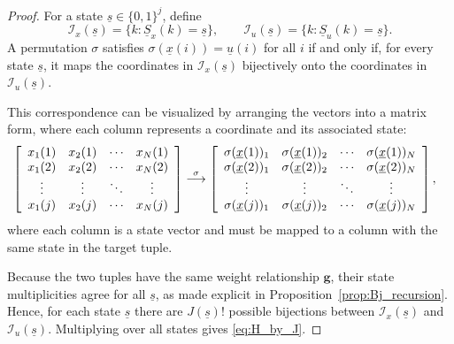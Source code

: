 \documentclass[letterpaper,draftclsnofoot,onecolumn]{IEEEtran}
\begin{document}
\begin{proof}
For a state $\underline{s}\in\{0,1\}^j$, define
\begin{equation}
\mathcal{I}_x(\underline{s})=\{k:\underline{S}_x(k)=\underline{s}\},
\qquad
\mathcal{I}_u(\underline{s})=\{k:\underline{S}_u(k)=\underline{s}\}.
\end{equation}
A permutation $\sigma$ satisfies $\sigma(\underline{x}(i))=\underline{u}(i)$ for all $i$ if and only if, for every state $\underline{s}$, it maps the coordinates in $\mathcal{I}_x(\underline{s})$ bijectively onto the coordinates in $\mathcal{I}_u(\underline{s})$.

This correspondence can be visualized by arranging the vectors into a matrix form, where each column represents a coordinate and its associated state:
\begin{align}
    &\left[\begin{array}[pos]{cccc}
        x_1(1) & x_2(1) & \cdots & x_N(1)\\
        x_1(2) & x_2(2) & \cdots & x_N(2)\\
        \vdots & \vdots & \ddots & \vdots\\
        x_1(j) & x_2(j) & \cdots & x_N(j)
    \end{array}\right]
    \overset{\sigma}{\longrightarrow}
    \left[\begin{array}[pos]{cccc}
        \sigma(\underline{x}(1))_1 & \sigma(\underline{x}(1))_2 & \cdots & \sigma(\underline{x}(1))_N\\
        \sigma(\underline{x}(2))_1 & \sigma(\underline{x}(2))_2 & \cdots & \sigma(\underline{x}(2))_N\\
        \vdots & \vdots & \ddots & \vdots\\
        \sigma(\underline{x}(j))_1 & \sigma(\underline{x}(j))_2 & \cdots & \sigma(\underline{x}(j))_N
    \end{array}\right],
    \label{eq:matrix}
\end{align}
where each column is a state vector and must be mapped to a column with the same state in the target tuple.

Because the two tuples have the same weight relationship $\mathbf{g}$, their state multiplicities agree for all $\underline{s}$, as made explicit in Proposition~\ref{prop:Bj_recursion}. Hence, for each state $\underline{s}$ there are $J(\underline{s})!$ possible bijections between $\mathcal{I}_x(\underline{s})$ and $\mathcal{I}_u(\underline{s})$. Multiplying over all states gives \eqref{eq:H_by_J}.
\end{proof}
\end{document}
